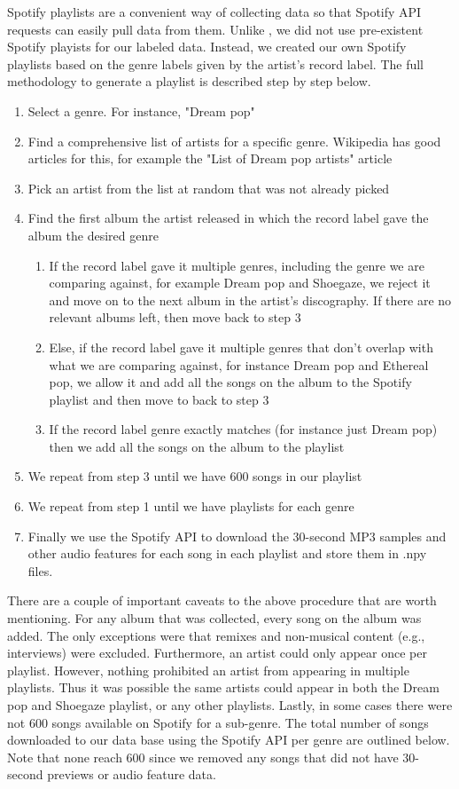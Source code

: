 \documentclass[letterpaper, 12 pt, conference]{ieeeconf}  %
\begin{document}
Spotify playlists are a convenient way of collecting data so that Spotify API requests can easily pull data from them. Unlike \cite{c5}, we did not use pre-existent Spotify playists for our labeled data. Instead, we created our own Spotify playlists based on the genre labels given by the artist’s record label. The full methodology to generate a playlist is described step by step below. 

\begin{enumerate}
    \item Select a genre. For instance, "Dream pop"
    \item Find a comprehensive list of artists for a specific genre. Wikipedia has good articles for this, for example the "List of Dream pop artists" article
    \item Pick an artist from the list at random that was not already picked
    \item Find the first album the artist released in which the record label gave the album the desired genre
    \begin{enumerate}
        \item If the record label gave it multiple genres, including the genre we are comparing against, for example Dream pop and Shoegaze, we reject it and move on to the next album in the artist's discography. If there are no relevant albums left, then move back to step 3
        \item Else, if the record label gave it multiple genres that don't overlap with what we are comparing against, for instance Dream pop and Ethereal pop, we allow it and add all the songs on the album to the Spotify playlist and then move to back to step 3
        \item If the record label genre exactly matches (for instance just Dream pop) then we add all the songs on the album to the playlist
    \end{enumerate}

    \item We repeat from step 3 until we have 600 songs in our playlist
    \item We repeat from step 1 until we have playlists for each genre
    \item Finally we use the Spotify API to download the 30-second MP3 samples and other audio features for each song in each playlist and store them in .npy files.
\end{enumerate}

There are a couple of important caveats to the above procedure that are worth mentioning. For any album that was collected, every song on the album was added. The only exceptions were that remixes and non-musical content (e.g., interviews) were excluded. Furthermore, an artist could only appear once per playlist. However, nothing prohibited an artist from appearing in multiple playlists. Thus it was possible the same artists could appear in both the Dream pop and Shoegaze playlist, or any other playlists. Lastly, in some cases there were not 600 songs available on Spotify for a sub-genre. The total number of songs downloaded to our data base using the Spotify API per genre are outlined below. Note that none reach 600 since we removed any songs that did not have 30-second previews or audio feature data.
\end{document}
